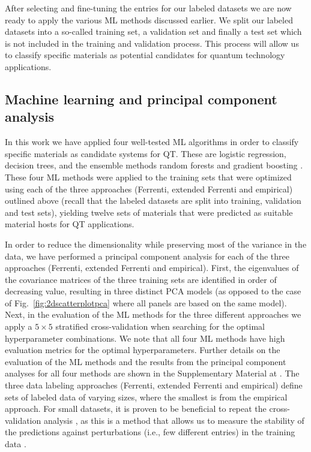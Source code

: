 \documentclass[superscriptaddress,unsortedaddress,
 amsmath,amssymb,
 aps,
]{revtex4-2}
\begin{document}
After selecting and fine-tuning the entries for our labeled datasets we are now ready to apply the various ML methods discussed earlier. We split our labeled datasets into a so-called training set, a validation set and finally a test set which is not included in the training and validation process. This process will allow us to classify specific materials as potential candidates for quantum technology applications. 

\subsection*{Machine learning and principal component analysis}
In this work we have applied four well-tested ML algorithms in order to classify specific materials as candidate systems for QT. These are logistic regression, decision trees, and the ensemble methods random forests and gradient boosting \cite{Mehta2019,Hastie2009,Murphy2012}. 
These four ML methods were applied to the training sets that were optimized using each of the three approaches (Ferrenti, extended Ferrenti and empirical) outlined above (recall that the labeled datasets are split into training, validation and test sets), yielding twelve sets of materials that were predicted as suitable material hosts for QT applications.  

In order to reduce the dimensionality while preserving most of the variance in the data, 
we have performed a principal component analysis  \cite{Jolliffe2002} for each of the three approaches (Ferrenti, extended Ferrenti and empirical).
First, the eigenvalues of the covariance matrices of the three training sets are identified in order of decreasing value, resulting in three distinct PCA models (as opposed to the case of Fig.~\ref{fig:2dscatterplotpca} where all panels are based on the same model). 
%
Next, in the evaluation of the ML methods for the three different approaches we apply a $5\times 5$ stratified cross-validation \cite{Hastie2009} when searching for the optimal hyperparameter combinations. We note that all four ML methods have high evaluation metrics for the optimal hyperparameters. Further details on the evaluation of the ML methods and the results from the principal component analyses for all four methods are shown in the Supplementary Material at \cite{supplementary}.  
%
The three data labeling approaches (Ferrenti, extended Ferrenti and empirical) define sets of labeled data of varying sizes, where the smallest is from the empirical approach. For small datasets, it is proven to be beneficial to repeat the cross-validation analysis \cite{Hastie2009}, as this is a method that allows us to measure the stability of the predictions against perturbations (i.e., few different entries) in the training data \cite{Beleites2008}.
\end{document}

